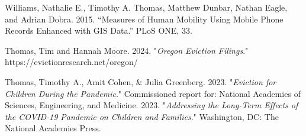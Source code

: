 \begin{cvparagraph}

Williams, Nathalie E., Timothy A. Thomas, Matthew Dunbar, Nathan Eagle, and Adrian Dobra. 2015. “Measures of Human Mobility Using Mobile Phone Records Enhanced
with GIS Data.” PLoS ONE, 33.
\end{cvparagraph}







\begin{cvparagraph}

Thomas, Tim and Hannah Moore. 2024. "\emph{Oregon Eviction Filings}." https://evictionresearch.net/oregon/
\end{cvparagraph}

\begin{cvparagraph}

Thomas, Timothy A., Amit Cohen, \& Julia Greenberg. 2023. "\emph{Eviction for Children During the Pandemic}." Commissioned report for: National Academies of Sciences, Engineering, and Medicine. 2023. "\emph{Addressing the Long-Term Effects of the COVID-19 Pandemic on Children and Families}." Washington, DC: The National Academies Press.
\end{cvparagraph}

